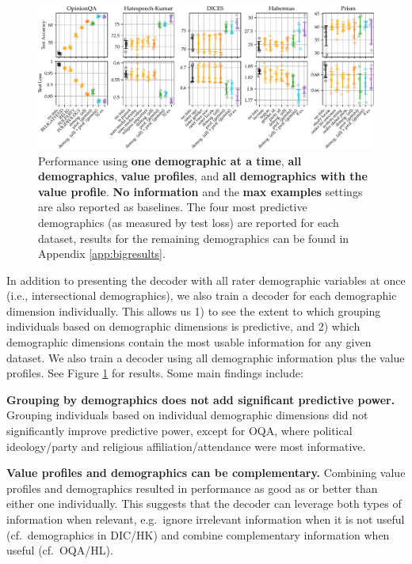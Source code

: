 \documentclass[11pt]{article}
\begin{document}
\begin{figure}[h]
\centering
\includegraphics[width=\textwidth]{files/demographics.pdf}
\caption{Performance using \textcolor{singledemcol}{\bf one demographic at a time}, \textcolor{demcolor}{\bf all demographics}, \textcolor{profcolor}{\bf value profiles}, and \textcolor{bothcol}{\bf all demographics with the value profile}. \textbf{No information} and the \textcolor{excolor}{\bf max examples} settings are also reported as baselines. The four most predictive demographics (as measured by test loss) are reported for each dataset, results for the remaining demographics can be found in Appendix \ref{app:bigresults}.}
\label{fig:demographicresults}
\end{figure}

In addition to presenting the decoder with all rater demographic variables at once (i.e., intersectional demographics), we also train a decoder for each demographic dimension individually. This allows us 1) to see the extent to which grouping individuals based on demographic dimensions is predictive, and 2) which demographic dimensions contain the most usable information for any given dataset. We also train a decoder using all demographic information plus the value profiles. See Figure \ref{fig:demographicresults} for results.
Some main findings include:

\textbf{Grouping by demographics does not add significant predictive power.} Grouping individuals based on individual demographic dimensions did not significantly improve predictive power, except for OQA, where political ideology/party and religious affiliation/attendance were most informative.

\textbf{Value profiles and demographics can be complementary.} Combining value profiles and demographics resulted in performance as good as or better than either one individually. This suggests that the decoder can leverage both types of information when relevant, e.g.\ ignore irrelevant information when it is not useful (cf.\ demographics in DIC/HK) and combine complementary information when useful (cf.\ OQA/HL).
\end{document}
